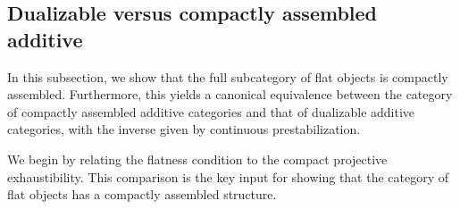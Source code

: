 \documentclass[a4paper,10pt, oneside]{amsart}
\begin{document}
\subsection{Dualizable versus compactly assembled additive \infcats}
	
	In this subsection, we show that the full subcategory of flat objects is compactly assembled. Furthermore, this yields a canonical equivalence between the category of compactly assembled additive categories and that of dualizable additive categories, with the inverse given by continuous prestabilization.
	
	We begin by relating the flatness condition to the compact projective exhaustibility. This comparison is the key input for showing that the category of flat objects has a compactly assembled structure.
	
\end{document}
